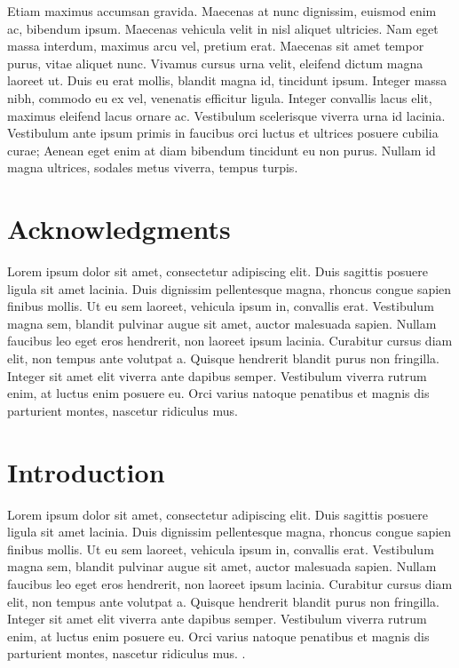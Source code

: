 \documentclass[
  a4paper,
  DIV=11,
  numbers=noendperiod]{scrreprt}
\begin{document}
Etiam maximus accumsan gravida. Maecenas at nunc dignissim, euismod enim
ac, bibendum ipsum. Maecenas vehicula velit in nisl aliquet ultricies.
Nam eget massa interdum, maximus arcu vel, pretium erat. Maecenas sit
amet tempor purus, vitae aliquet nunc. Vivamus cursus urna velit,
eleifend dictum magna laoreet ut. Duis eu erat mollis, blandit magna id,
tincidunt ipsum. Integer massa nibh, commodo eu ex vel, venenatis
efficitur ligula. Integer convallis lacus elit, maximus eleifend lacus
ornare ac. Vestibulum scelerisque viverra urna id lacinia. Vestibulum
ante ipsum primis in faucibus orci luctus et ultrices posuere cubilia
curae; Aenean eget enim at diam bibendum tincidunt eu non purus. Nullam
id magna ultrices, sodales metus viverra, tempus turpis.

\newpage{}


\chapter*{Acknowledgments}\label{acknowledgments}


Lorem ipsum dolor sit amet, consectetur adipiscing elit. Duis sagittis
posuere ligula sit amet lacinia. Duis dignissim pellentesque magna,
rhoncus congue sapien finibus mollis. Ut eu sem laoreet, vehicula ipsum
in, convallis erat. Vestibulum magna sem, blandit pulvinar augue sit
amet, auctor malesuada sapien. Nullam faucibus leo eget eros hendrerit,
non laoreet ipsum lacinia. Curabitur cursus diam elit, non tempus ante
volutpat a. Quisque hendrerit blandit purus non fringilla. Integer sit
amet elit viverra ante dapibus semper. Vestibulum viverra rutrum enim,
at luctus enim posuere eu. Orci varius natoque penatibus et magnis dis
parturient montes, nascetur ridiculus mus.

\newpage{}

\tableofcontents

\newpage{}


\chapter{Introduction}\label{introduction}


Lorem ipsum dolor sit amet, consectetur adipiscing elit. Duis sagittis
posuere ligula sit amet lacinia. Duis dignissim pellentesque magna,
rhoncus congue sapien finibus mollis. Ut eu sem laoreet, vehicula ipsum
in, convallis erat. Vestibulum magna sem, blandit pulvinar augue sit
amet, auctor malesuada sapien. Nullam faucibus leo eget eros hendrerit,
non laoreet ipsum lacinia. Curabitur cursus diam elit, non tempus ante
volutpat a. Quisque hendrerit blandit purus non fringilla. Integer sit
amet elit viverra ante dapibus semper. Vestibulum viverra rutrum enim,
at luctus enim posuere eu. Orci varius natoque penatibus et magnis dis
parturient montes, nascetur ridiculus mus.
\autocite{manesArtScienceEngineering2019,yaoTreeThoughtsDeliberate2023}.
\end{document}
